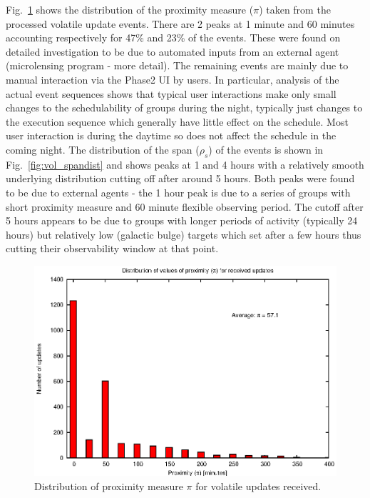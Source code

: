 
Fig.~\ref{fig:vol_pidist} shows the distribution of the proximity measure ($\pi$) taken from the processed volatile update events. There are 2 peaks at 1 minute and 60 minutes accounting respectively for 47\% and 23\% of the events. These were found on detailed investigation to be due to automated inputs from an external agent (microlensing program - more detail). The remaining events are mainly due to manual interaction via the Phase2 UI by users. In particular, analysis of the actual event sequences shows that typical user interactions make only small changes to the schedulability of groups during the night, typically just changes to the execution sequence which generally have little effect on the schedule. Most user interaction is during the daytime so does not affect the schedule in the coming night. The distribution of the span ($\rho_s$) of the events is shown in Fig.~\ref{fig:vol_spandist} and shows peaks at 1 and 4 hours with a relatively smooth underlying distribution cutting off after around 5 hours. Both peaks were found to be due to external agents - the 1 hour peak is due to a series of groups with short proximity measure and 60 minute flexible observing  period. The cutoff after 5 hours appears to be due to groups with longer periods of activity (typically 24 hours) but relatively low (galactic bulge) targets which set after a few hours thus cutting their observability window at that point.


\begin{figure}[htbp]
\begin{center}
    \includegraphics[scale=1.0, angle=0]{figures/vol_pi.eps}
\caption[Distribution of proximity measure $\pi$ for volatile updates received.]
{Distribution of proximity measure $\pi$ for volatile updates received.}
\label{fig:vol_pidist}
\end{center}
\end{figure}

